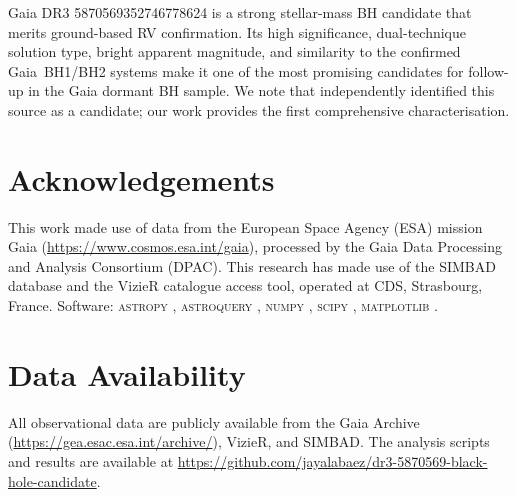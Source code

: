 \documentclass[usenatbib,fleqn]{mnras}
\begin{document}
Gaia DR3 5870569352746778624 is a strong stellar-mass BH candidate
that merits ground-based RV confirmation.  Its high significance,
dual-technique solution type, bright apparent magnitude, and
similarity to the confirmed Gaia~BH1/BH2 systems make it one of
the most promising candidates for follow-up in the Gaia dormant
BH sample.  We note that \citet{Tanikawa2023} independently
identified this source as a candidate; our work provides the
first comprehensive characterisation.

\section*{Acknowledgements}

This work made use of data from the European Space Agency (ESA)
mission Gaia (\url{https://www.cosmos.esa.int/gaia}), processed by
the Gaia Data Processing and Analysis Consortium (DPAC).
This research has made use of the SIMBAD database and the VizieR
catalogue access tool, operated at CDS, Strasbourg, France.
Software: \textsc{astropy} \citep{Astropy2022},
\textsc{astroquery} \citep{Astroquery2019}, \textsc{numpy}
\citep{Harris2020}, \textsc{scipy} \citep{Virtanen2020},
\textsc{matplotlib} \citep{Hunter2007}.

\section*{Data Availability}

All observational data are publicly available from the Gaia Archive
(\url{https://gea.esac.esa.int/archive/}), VizieR, and SIMBAD.
The analysis scripts and results are available at
\url{https://github.com/jayalabaez/dr3-5870569-black-hole-candidate}.




\end{document}
